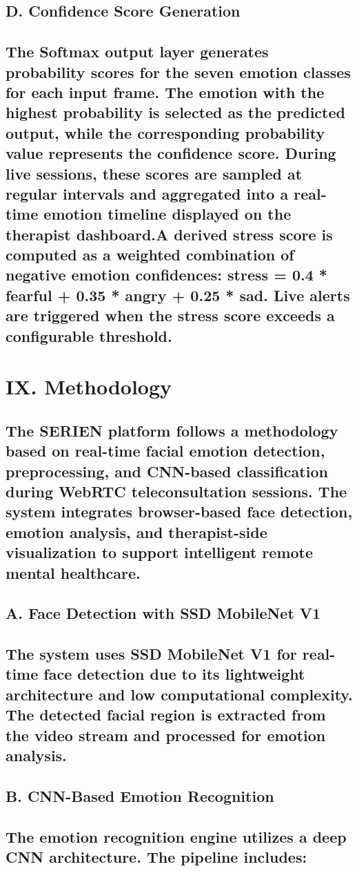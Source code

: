 \documentclass[conference]{IEEEtran}
\begin{document}
\subsection{D. Confidence Score Generation}
\subsection{The Softmax output layer generates probability scores for the seven emotion classes for each input frame. The emotion with the highest probability is selected as the predicted output, while the corresponding probability value represents the confidence score. During live sessions, these scores are sampled at regular intervals and aggregated into a real-time emotion timeline displayed on the therapist dashboard.A derived stress score is computed as a weighted combination of negative emotion confidences: stress = 0.4 * fearful + 0.35 * angry + 0.25 * sad. Live alerts are triggered when the stress score exceeds a configurable threshold.}
\section{IX. Methodology}
\subsection{The SERIEN platform follows a methodology based on real-time facial emotion detection, preprocessing, and CNN-based classification during WebRTC teleconsultation sessions. The system integrates browser-based face detection, emotion analysis, and therapist-side visualization to support intelligent remote mental healthcare.}
\subsection{A. Face Detection with SSD MobileNet V1}
\subsection{The system uses SSD MobileNet V1 for real-time face detection due to its lightweight architecture and low computational complexity. The detected facial region is extracted from the video stream and processed for emotion analysis.}
\subsection{B. CNN-Based Emotion Recognition}
\subsection{The emotion recognition engine utilizes a deep CNN architecture. The pipeline includes:}
\end{document}
